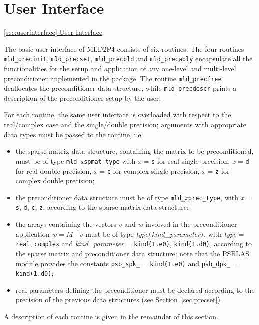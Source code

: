 \section{User Interface\label{sec:userinterface}}
         {\underline{\ref{sec:userinterface} User Interface}}

The basic user interface of MLD2P4 consists of six routines. The four routines \verb|mld_precinit|,
\verb|mld_precset|, \verb|mld_precbld| and \verb|mld_precaply| encapsulate all the functionalities for the setup and application of any one-level and multi-level
preconditioner implemented in the package.
The routine \verb|mld_precfree| deallocates the preconditioner data structure, while
\verb|mld_precdescr| prints a description of the preconditioner setup by the user.

For each routine, the same user interface is overloaded with
respect to the real/complex case and the single/double precision;
arguments with appropriate data types must be passed to the routine,
i.e.
\begin{itemize}
\item the sparse matrix data structure, containing the matrix to be
  preconditioned, must be of type \verb|mld_|\emph{x}\verb|spmat_type|
	with \emph{x} = \verb|s| for real single precision, \emph{x} = \verb|d|
	for real double precision, \emph{x} = \verb|c| for complex single precision,
	\emph{x} = \verb|z| for complex double precision;
\item the preconditioner data structure must be of type
  \verb|mld_|\emph{x}\verb|prec_type|, with \emph{x} =    
  \verb|s|, \verb|d|, \verb|c|, \verb|z|, according to the sparse
  matrix data structure;
\item the arrays containing the vectors $v$ and $w$ involved in
  the preconditioner application $w=M^{-1}v$ must be of type   
  \emph{type}\verb|(|\emph{kind\_parameter}\verb|)|, with \emph{type} =
  \verb|real|, \verb|complex| and \emph{kind\_parameter} = \verb|kind(1.e0)|,
  \verb|kind(1.d0)|, according to the sparse matrix and preconditioner
  data structure; note that the PSBLAS module provides the constants \verb|psb_spk_|
  = \verb|kind(1.e0)| and \verb|psb_dpk_| = \verb|kind(1.d0)|;
\item real parameters defining the preconditioner must be declared
  according to the precision of the previous data structures
  (see Section~\ref{sec:precset}).
\end{itemize}
A description of each routine is given in the remainder of this section.


